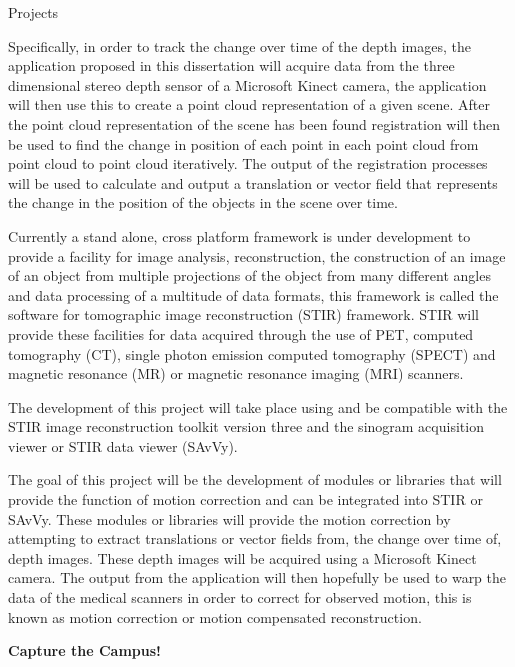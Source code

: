 \documentclass{cv}
\begin{document}
\begin{rSection}{Projects}
\item Specifically, in order to track the change over time of the depth images, the application proposed in this dissertation will acquire data from the three dimensional stereo depth sensor of a Microsoft Kinect camera, the application will then use this to create a point cloud representation of a given scene. After the point cloud representation of the scene has been found registration will then be used to find the change in position of each point in each point cloud from point cloud to point cloud iteratively. The output of the registration processes will be used to calculate and output a translation or vector field that represents the change in the position of the objects in the scene over time.

\item Currently a stand alone, cross platform framework is under development to provide a facility for image analysis, reconstruction, the construction of an image of an object from multiple projections of the object from many different angles and data processing of a multitude of data formats, this framework is called the software for tomographic image reconstruction (STIR) framework. STIR will provide these facilities for data acquired through the use of PET, computed tomography (CT), single photon emission computed tomography (SPECT) and magnetic resonance (MR) or magnetic resonance imaging (MRI) scanners.

\item The development of this project will take place using and be compatible with the STIR image reconstruction toolkit version three and the sinogram acquisition viewer or STIR data viewer (SAvVy).

\item The goal of this project will be the development of modules or libraries that will provide the function of motion correction and can be integrated into STIR or SAvVy. These modules or libraries will provide the motion correction by attempting to extract translations or vector fields from, the change over time of, depth images. These depth images will be acquired using a Microsoft Kinect camera. The output from the application will then hopefully be used to warp the data of the medical scanners in order to correct for observed motion, this is known as motion correction or motion compensated reconstruction.


{\bf Capture the Campus!} \hfill {\em} 


\end{rSection}
\end{document}
